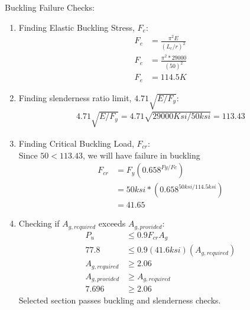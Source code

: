 \documentclass{report} %
\begin{document}
Buckling Failure Checks:
\begin{enumerate}
    \item Finding Elastic Buckling Stress, $F_e$:
        \begin{equation*}
            \begin{aligned}
                F_e &= \frac{\pi^2E}{(L_c/r)^2} \\
                F_e &= \frac{\pi^2*29000}{(50)^2} \\
                F_e &= 114.5K
            \end{aligned}
        \end{equation*}
    \item Finding slenderness ratio limit, $4.71\sqrt{E/F_y}$:
        \begin{equation*}
            \begin{aligned}
                4.71\sqrt{E/F_y} = 4.71\sqrt{29000Ksi/50ksi} = 113.43 
            \end{aligned}
        \end{equation*}
    \item Finding Critical Buckling Load, $F_{cr}$: \\
        Since $50 < 113.43$, we will have failure in buckling 
        \begin{equation*}
            \begin{aligned}
                F_{cr} &= F_y(0.658^{Fy/Fe}) \\
                        &= 50ksi * (0.658^{50ksi/114.5ksi}) \\
                        &= 41.65
            \end{aligned}
        \end{equation*}
    \item Checking if $A_{g,required}$ exceeds $A_{g,provided}$:
        \begin{equation*}
            \begin{aligned}
                P_u &\leq 0.9F_{cr}A_g \\
                77.8 &\leq 0.9(41.6ksi)(A_{g,required}) \\
                A_{g,required} &\geq 2.06 \\
                A_{g,provided} &\geq A_{g,required} \\
                7.696 &\geq 2.06 
            \end{aligned}
        \end{equation*}
        Selected section passes buckling and slenderness checks.
\end{enumerate}
\end{document}
